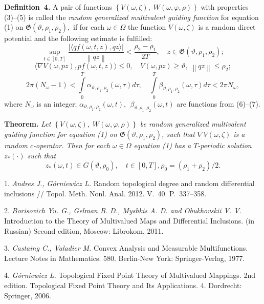 {{{\textbf{Definition~4.} A pair of functions $\left\{ {V(\omega,\zeta),\;W(\omega,\varphi,\rho )} \right\}$ with properties (3)--(5) is called the {\it random generalized multiva\-lent guiding function} for equation (1) on $\mathfrak{G}\left({\vartheta ,\rho _{1} ,\rho _{2} } \right),$ if for each $\omega\in\Omega$ the function $V(\omega,\zeta)$ is a random direct potential and the following estimate is fulfilled:
$$
\mathop {\sup}\limits_{t \in \left[ {0,T} \right]}\frac{{\left| {\langle {qf(\omega,t,z),qz} \rangle} \right|}}{{\left\|{qz} \right\|}} < \frac{{\rho _{2} - \rho _{1} }}{{2T}},\quad z\in \mathfrak{G} (\vartheta ,\rho _{1} ,\rho _{2} );
$$
$$
\langle\nabla V(\omega,pz),pf(\omega,t,z)\rangle \leqslant 0,\quad V(\omega,pz) \geqslant \vartheta ,\;\left\| {qz} \right\| \leqslant \rho _{2};
$$
$$
2\pi (N_{\omega} - 1) < \int\limits_{0}^{T} {\alpha_{\vartheta ,\rho _{1} ,\rho _{2} } (\omega,\tau )d\tau } , \quad
\int\limits_{0}^{T} {\beta _{\vartheta ,\rho _{1} ,\rho _{2} } (\omega,\tau )d\tau < 2\pi N_{\omega}},
$$
where $N_{\omega}$ is an integer; $\alpha _{\vartheta ,\rho_{1} ,\rho _{2} } (\omega,t),\,\;\beta _{\vartheta ,\rho _{1} ,\rho _{2}} (\omega,t)$ are functions from  (6)--(7).

\textbf{Theorem.} {\it
	Let $\left\{ {V(\omega,\zeta),\;W(\omega,\varphi,\rho )} \right\}$
	be random generalized multivalent guiding function for equation (1) on
	$\mathfrak{G}\left({\vartheta ,\rho _{1} ,\rho _{2} } \right)$,
	such that $\nabla V(\omega,\zeta)$ is a random $c$-operator.
	Then for each $\omega\in\Omega$ equation (1) has a $T$-periodic solution $z_{ * } ( \cdot )$  such that
}
$$
z_{ * } (\omega,t) \in G(\vartheta,\rho _{0}),\quad t \in [0,T], \rho _{0} = \left( {\rho _{1} + \rho _{2} } \right)/2.
$$
\litlist

1. {\it Andres J., G\'orniewicz L.} Random topological degree and random differential inclusions // Topol. Meth. Nonl. Anal. 2012. V.\, 40. P.\, 337--358.

2. {\it Borisovich Yu. G., Gelman B. D., Myshkis A. D. and Obukhovskii V. V.} Introduction to the Theory of Multivalued Maps and Differential Inclusions. (in Russian) Second edition, Moscow: Librokom, 2011.

3. {\it Castaing C., Valadier M.} Convex Analysis and Measurable Multifunctions. Lecture Notes in Mathematics. 580. Berlin-New York: Springer-Verlag, 1977.

4. {\it G\'{o}rniewicz L.} Topological Fixed Point Theory of Multi\-valued Mappings. 2nd edition. Topological Fixed Point Theory and Its Applications. 4. Dordrecht: Springer, 2006.

}}}
